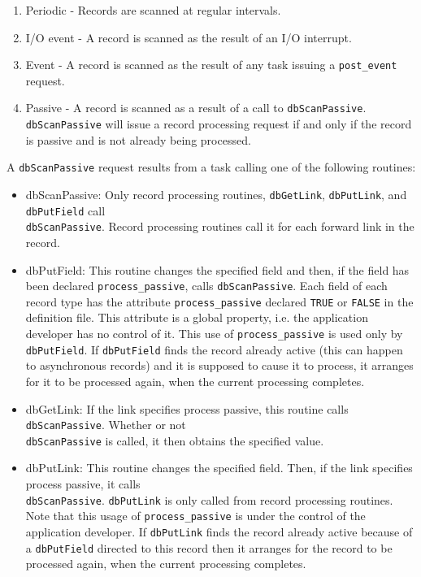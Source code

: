 \begin{enumerate}
\item {}Periodic - Records are scanned at regular intervals.

\item {}I/O event - A record is scanned as the result of an I/O interrupt.

\item {}Event - A record is scanned as the result of any task issuing a \verb|post_event| request.

\item {}Passive - A record is scanned as a result of a call to \verb|dbScanPassive|. \verb|dbScanPassive| will issue a record 
processing request if and only if the record is passive and is not already being processed.

\end{enumerate}

A \verb|dbScanPassive| request results from a task calling one of the following routines:

\begin{itemize}
\item {}dbScanPassive:  Only record processing routines, \verb|dbGetLink|, \verb|dbPutLink|, and \verb|dbPutField| call \\
\verb|dbScanPassive|. Record processing routines call it for each forward link in the record. 

\item {}dbPutField:  This routine changes the specified field and then, if the field has been declared \verb|process_passive|, 
calls \verb|dbScanPassive|. Each field of each record type has the attribute \verb|process_passive| declared \verb|TRUE| or 
\verb|FALSE| in the definition file. This attribute is a global property, i.e. the application developer has no control of it. 
This use of \verb|process_passive| is used only by \verb|dbPutField|. If \verb|dbPutField| finds the record already active 
(this can happen to asynchronous records) and it is supposed to cause it to process, it arranges for it to be processed 
again, when the current processing completes.

\item {}dbGetLink:  If the link specifies process passive, this routine calls \verb|dbScanPassive|. Whether or not \\
\verb|dbScanPassive| is called, it then obtains the specified value. 

\item {}dbPutLink:  This routine changes the specified field. Then, if the link specifies process passive, it calls \\
\verb|dbScanPassive|. \verb|dbPutLink| is only called from record processing routines. Note that this usage of 
\verb|process_passive| is under the control of the application developer. If \verb|dbPutLink| finds the record already 
active because of a \verb|dbPutField| directed to this record then it arranges for the record to be processed again,  
when the current processing completes.

\end{itemize}

